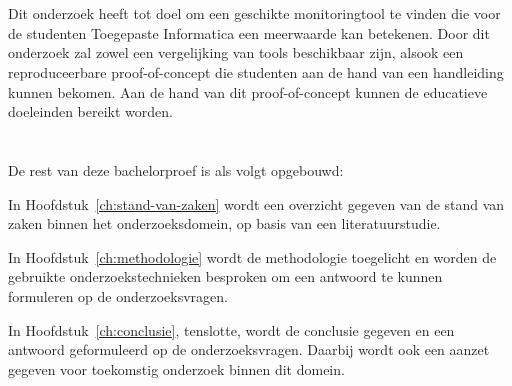 
\section{}
\label{sec:onderzoeksdoelstelling}

Dit onderzoek heeft tot doel om een geschikte monitoringtool te vinden die voor de studenten Toegepaste Informatica een meerwaarde kan betekenen. Door dit onderzoek zal zowel een vergelijking van tools beschikbaar zijn, alsook een reproduceerbare proof-of-concept die studenten aan de hand van een handleiding kunnen bekomen. Aan de hand van dit proof-of-concept kunnen de educatieve doeleinden bereikt worden.

\section{}
\label{sec:opzet-bachelorproef}


De rest van deze bachelorproef is als volgt opgebouwd:

In Hoofdstuk~\ref{ch:stand-van-zaken} wordt een overzicht gegeven van de stand van zaken binnen het onderzoeksdomein, op basis van een literatuurstudie.

In Hoofdstuk~\ref{ch:methodologie} wordt de methodologie toegelicht en worden de gebruikte onderzoekstechnieken besproken om een antwoord te kunnen formuleren op de onderzoeksvragen.


In Hoofdstuk~\ref{ch:conclusie}, tenslotte, wordt de conclusie gegeven en een antwoord geformuleerd op de onderzoeksvragen. Daarbij wordt ook een aanzet gegeven voor toekomstig onderzoek binnen dit domein.